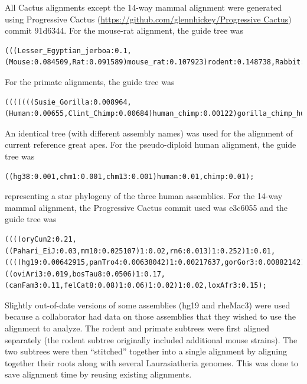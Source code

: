 \documentclass[fleqn,10pt]{wlscirep}
\begin{document}
All Cactus alignments except the 14-way mammal alignment were generated using Progressive Cactus (\url{https://github.com/glennhickey/Progressive Cactus}) commit 91d6344. For the mouse-rat alignment, the guide tree was 

\begin{lstlisting}
(((Lesser_Egyptian_jerboa:0.1,(Mouse:0.084509,Rat:0.091589)mouse_rat:0.107923)rodent:0.148738,Rabbit:0.21569)glires:0.015313,Human:0.143908);
\end{lstlisting}

For the primate alignments, the guide tree was 
  
\begin{lstlisting}
(((((((Susie_Gorilla:0.008964,(Human:0.00655,Clint_Chimp:0.00684)human_chimp:0.00122)gorilla_chimp_human:0.009693,Susie_Orangutan:0.01894)great_ape:0.003471,Gibbon:0.02227)great_ape_gibbon:0.01204,Rhesus:0.004991)old_world_monkey:0.02183,Squirrel_monkey:0.01035)monkey:0.05209,Bushbaby:0.1194)primate_anc:0.013494,Mouse:0.084509);
\end{lstlisting}
  
An identical tree (with different assembly names) was used for the alignment of current reference great apes. For the pseudo-diploid human alignment, the guide tree was 
  
\begin{lstlisting}
((hg38:0.001,chm1:0.001,chm13:0.001)human:0.01,chimp:0.01);
\end{lstlisting}
  
representing a star phylogeny of the three human assemblies. For the 14-way mammal alignment, the Progressive Cactus commit used was e3c6055 and the guide tree was 
  
\begin{lstlisting}
((((oryCun2:0.21,((Pahari_EiJ:0.03,mm10:0.025107)1:0.02,rn6:0.013)1:0.252)1:0.01,((((hg19:0.00642915,panTro4:0.00638042)1:0.00217637,gorGor3:0.00882142)1:0.00935116,ponAbe2:0.0185056)1:0.00440069,rheMac3:0.007)1:0.1)1:0.02,((oviAri3:0.019,bosTau8:0.0506)1:0.17,(canFam3:0.11,felCat8:0.08)1:0.06)1:0.02)1:0.02,loxAfr3:0.15);
\end{lstlisting}

Slightly out-of-date versions of some assemblies (hg19 and rheMac3) were used because a collaborator had data on those assemblies that they wished to use the alignment to analyze. The rodent and primate subtrees were first aligned separately (the rodent subtree originally included additional mouse strains). The two subtrees were then “stitched” together into a single alignment by aligning together their roots along with several Laurasiatheria genomes. This was done to save alignment time by reusing existing alignments.
\end{document}
